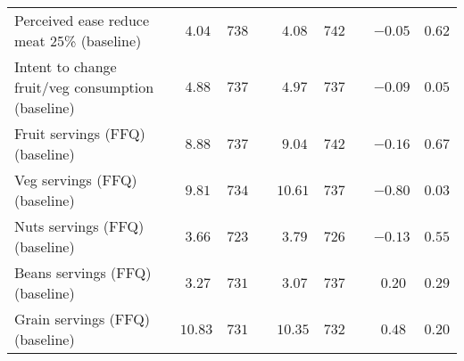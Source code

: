 \begin{table*}[ht]
\begin{center}
\begin{tabular}{lcccccccc}
Perceived ease reduce meat 25\% (baseline)&$~4.04$&$738$&&$~4.08$&$742$&&$-0.05$&$0.62$\tabularnewline
Intent to change fruit/veg consumption (baseline)&$~4.88$&$737$&&$~4.97$&$737$&&$-0.09$&$0.05$\tabularnewline
Fruit servings (FFQ) (baseline)&$~8.88$&$737$&&$~9.04$&$742$&&$-0.16$&$0.67$\tabularnewline
Veg servings (FFQ) (baseline)&$~9.81$&$734$&&$10.61$&$737$&&$-0.80$&$0.03$\tabularnewline
Nuts servings (FFQ) (baseline)&$~3.66$&$723$&&$~3.79$&$726$&&$-0.13$&$0.55$\tabularnewline
Beans servings (FFQ) (baseline)&$~3.27$&$731$&&$~3.07$&$737$&&$~0.20$&$0.29$\tabularnewline
Grain servings (FFQ) (baseline)&$10.83$&$731$&&$10.35$&$732$&&$~0.48$&$0.20$\tabularnewline
\hline
\end{tabular}\end{center}

\end{table*}
